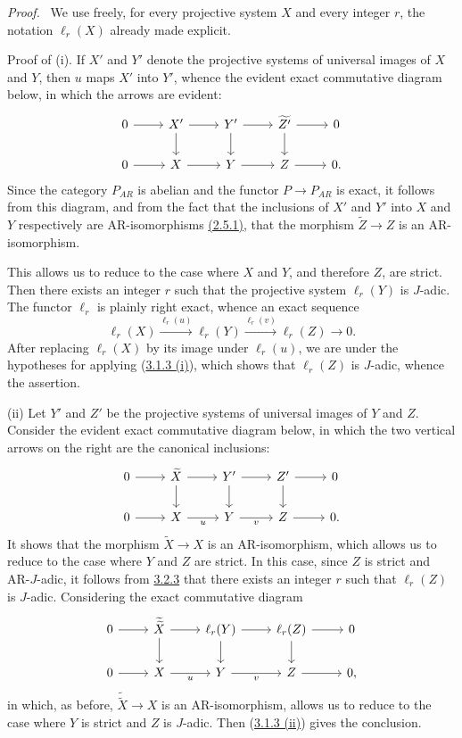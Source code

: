 \documentclass[11pt]{article}
\newenvironment{prooftext}[1][Proof]{\par\noindent\emph{#1.}\ }{\par\medskip}
\begin{document}
\begin{prooftext}[Proof]
We use freely, for every projective system $X$ and every integer $r$, the notation $\ell_r(X)$ already made explicit.

Proof of (i). If $X'$ and $Y'$ denote the projective systems of universal images of $X$ and $Y$, then $u$ maps $X'$ into $Y'$, whence the evident exact commutative diagram below, in which the arrows are evident:
\[
\begin{tikzcd}
0 \arrow[r] & X' \arrow[r] \arrow[d] & Y' \arrow[r] \arrow[d] & \widetilde{Z'} \arrow[r] \arrow[d] & 0\\
0 \arrow[r] & X \arrow[r] & Y \arrow[r] & Z \arrow[r] & 0 .
\end{tikzcd}
\]
Since the category $P_{AR}$ is abelian and the functor $P\to P_{AR}$ is exact, it follows from this diagram, and from the fact that the inclusions of $X'$ and $Y'$ into $X$ and $Y$ respectively are AR-isomorphisms \hyperref[sga5:V:proposition:2.5.1]{(2.5.1)}, that the morphism $\widetilde Z\to Z$ is an AR-isomorphism.

This allows us to reduce to the case where $X$ and $Y$, and therefore $Z$, are strict. Then there exists an integer $r$ such that the projective system $\ell_r(Y)$ is $J$-adic. The functor $\ell_r$ is plainly right exact, whence an exact sequence
\[
\ell_r(X)\stackrel{\ell_r(u)}{\longrightarrow}\ell_r(Y)\stackrel{\ell_r(v)}{\longrightarrow}\ell_r(Z)\longrightarrow0.
\]
After replacing $\ell_r(X)$ by its image under $\ell_r(u)$, we are under the hypotheses for applying (\hyperref[sga5:V:proposition:3.1.3]{3.1.3 (i)}), which shows that $\ell_r(Z)$ is $J$-adic, whence the assertion.

(ii) Let $Y'$ and $Z'$ be the projective systems of universal images of $Y$ and $Z$. Consider the evident exact commutative diagram below, in which the two vertical arrows on the right are the canonical inclusions:
\[
\begin{tikzcd}
0 \arrow[r] & \widetilde X \arrow[r] \arrow[d] & Y' \arrow[r] \arrow[d] & Z' \arrow[r] \arrow[d] & 0\\
0 \arrow[r] & X \arrow[r,"u"'] & Y \arrow[r,"v"'] & Z \arrow[r] & 0 .
\end{tikzcd}
\]
It shows that the morphism $\widetilde X\to X$ is an AR-isomorphism, which allows us to reduce to the case where $Y$ and $Z$ are strict. In this case, since $Z$ is strict and AR-$J$-adic, it follows from \hyperref[sga5:V:proposition:3.2.3]{3.2.3} that there exists an integer $r$ such that $\ell_r(Z)$ is $J$-adic. Considering the exact commutative diagram
\[
\begin{tikzcd}
0 \arrow[r] & \widetilde{\widetilde X} \arrow[r] \arrow[d] & \ell_r(Y) \arrow[r] \arrow[d] & \ell_r(Z) \arrow[r] \arrow[d] & 0\\
0 \arrow[r] & X \arrow[r,"u"'] & Y \arrow[r,"v"'] & Z \arrow[r] & 0,
\end{tikzcd}
\]
in which, as before, $\widetilde{\widetilde X}\to X$ is an AR-isomorphism, allows us to reduce to the case where $Y$ is strict and $Z$ is $J$-adic. Then (\hyperref[sga5:V:proposition:3.1.3]{3.1.3 (ii)}) gives the conclusion.
\end{prooftext}
\end{document}
